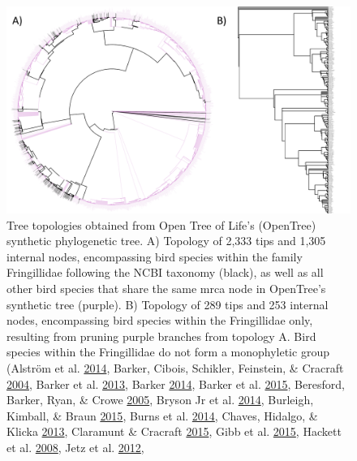 \begin{figure}[!h]
\includegraphics{../figures/fringillidae-topologies/fringillidae-topology.pdf}
\caption{Tree topologies obtained from Open Tree of Life's (OpenTree) synthetic phylogenetic tree. A) Topology of 2,333 tips and 1,305 internal nodes, encompassing bird species within the family Fringillidae following the NCBI taxonomy (black), as well as all other bird species that share the same mrca node in OpenTree's synthetic tree (purple). B) Topology of 289 tips and 253 internal nodes, encompassing bird species within the Fringillidae only, resulting from pruning purple branches from topology A.
Bird species within the Fringillidae do not form a monophyletic group
(Alström et al. \protect\hyperlink{ref-}{2014},
Barker, Cibois, Schikler, Feinstein, \& Cracraft \protect\hyperlink{ref-barker2004phylogeny}{2004},
Barker et al. \protect\hyperlink{ref-barker2013going}{2013},
Barker \protect\hyperlink{ref-barker2014mitogenomic}{2014},
Barker et al. \protect\hyperlink{ref-barker2015new}{2015},
Beresford, Barker, Ryan, \& Crowe \protect\hyperlink{ref-beresford2005african}{2005},
Bryson Jr et al. \protect\hyperlink{ref-bryson2014diversification}{2014},
Burleigh, Kimball, \& Braun \protect\hyperlink{ref-burleigh2015building}{2015},
Burns et al. \protect\hyperlink{ref-burns2014phylogenetics}{2014},
Chaves, Hidalgo, \& Klicka \protect\hyperlink{ref-chaves2013biogeography}{2013},
Claramunt \& Cracraft \protect\hyperlink{ref-claramunt2015new}{2015},
Gibb et al. \protect\hyperlink{ref-gibb2015new}{2015},
Hackett et al. \protect\hyperlink{ref-hackett2008phylogenomic}{2008},
Jetz et al. \protect\hyperlink{ref-Jetz2012}{2012},
}
\end{figure}
